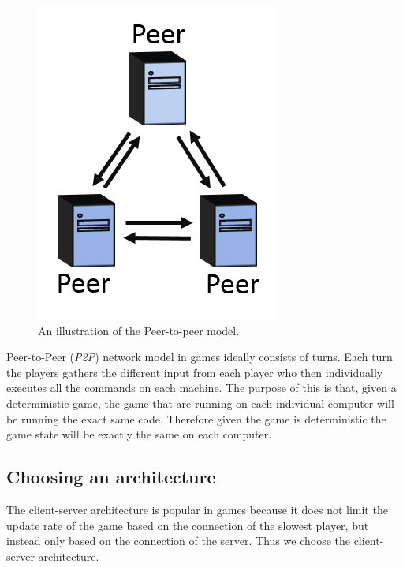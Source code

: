 \begin{figure}[H]
\centering
\includegraphics[scale=1]{figures/network/peer_peer}
\caption{An illustration of the Peer-to-peer model.}
\label{fig:peer_peer}
\end{figure}

Peer-to-Peer (\textit{P2P}) network model in games ideally consists of turns.
Each turn the players gathers the different input from each player who then individually executes all the commands on each machine.
The purpose of this is that, given a deterministic game, the game that are running on each individual computer will be running the exact same code. 
Therefore given the game is deterministic the game state will be exactly the same on each computer. 

\subsection{Choosing an architecture}
The client-server architecture is popular in games because it does not limit the update rate of the game based on the connection of the slowest player, but instead only based on the connection of the server.
Thus we choose the client-server architecture.